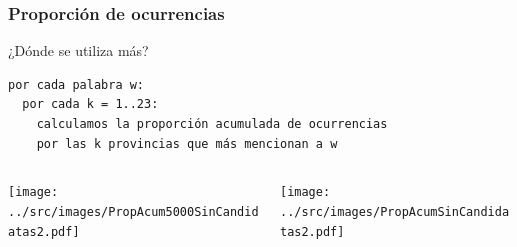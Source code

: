 \begin{frame}[fragile]\frametitle{Proporción de ocurrencias}
    ¿Dónde se utiliza más?
\begin{verbatim}
por cada palabra w:
  por cada k = 1..23:
    calculamos la proporción acumulada de ocurrencias 
    por las k provincias que más mencionan a w
\end{verbatim}
\begin{columns}
\begin{column}{.5\linewidth}
\centering
\texttt{[image: ../src/images/PropAcum5000SinCandidatas2.pdf]}
\end{column}
\begin{column}{.5\linewidth}
\centering
\texttt{[image: ../src/images/PropAcumSinCandidatas2.pdf]}
\end{column}
\end{columns}
           

\end{frame}